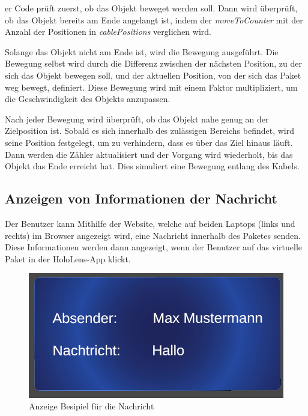 er Code prüft zuerst, ob das Objekt beweget werden soll. Dann wird überprüft, ob das Objekt bereits am Ende angelangt ist, indem der \textit{moveToCounter} mit der Anzahl der Positionen in \textit{cablePositions} verglichen wird.

Solange das Objekt nicht am Ende ist, wird die Bewegung ausgeführt. Die Bewegung selbst wird durch die Differenz zwischen der nächsten Position, zu der sich das Objekt bewegen soll, und der aktuellen Position, von der sich das Paket weg bewegt, definiert. Diese Bewegung wird mit einem Faktor multipliziert, um die Geschwindigkeit des Objekts anzupassen.

Nach jeder Bewegung wird überprüft, ob das Objekt nahe genug an der Zielposition ist. Sobald es sich innerhalb des zulässigen Bereichs befindet, wird seine Position festgelegt, um zu verhindern, dass es über das Ziel hinaus läuft. Dann werden die Zähler aktualisiert und der Vorgang wird wiederholt, bis das Objekt das Ende erreicht hat. Dies simuliert eine Bewegung entlang des Kabels.


\subsection{\label{sec:pingInfoJonas}Anzeigen von Informationen der Nachricht}
Der Benutzer kann Mithilfe der Website, welche auf beiden Laptops (links und rechts) im Browser angezeigt wird, eine Nachricht
innerhalb des Paketes senden. Diese Informationen werden dann angezeigt, wenn der Benutzer auf das virtuelle Paket in der HoloLens-App klickt.
\begin{figure}[H]
    \centering
    \includegraphics[width=0.5\linewidth]{images/NachrichtenAnzeige.png}
    \caption{Anzeige Besipiel für die Nachricht}
    \label{fig:enter-label}
\end{figure}
\\
